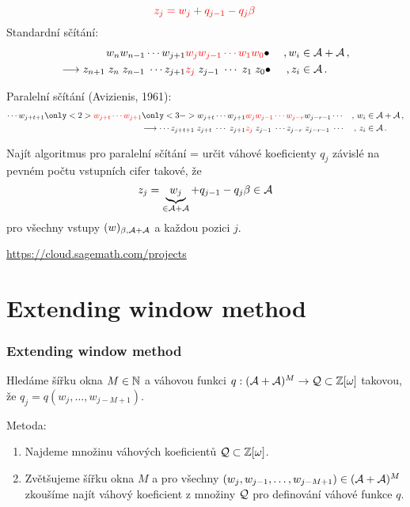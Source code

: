 \documentclass[11pt]{beamer}
\begin{document}
\begin{frame}
    $$
        \textcolor{red}{z_j=w_j + q_{j-1} - q_j \beta}\,
    $$
  Standardní sčítání:%
  \begin{align*}
    w_n w_{n-1}\cdots w_{j+1}& \textcolor{red}{w_j w_{j-1} \cdots w_1 w_0}\bullet& \,,w_i &\in \mathcal{A}+\mathcal{A}\,,    \\
    \longrightarrow z_{n+1}\; z_{n}\; z_{n-1}\;\cdots z_{j+1} &\textcolor{red}{z_j} \; z_{j-1}\; \cdots \;z_1 \; z_0\bullet& \,,z_i &\in \mathcal{A}\,.
  \end{align*}
    
  \pause 
   Paralelní sčítání (Avizienis, 1961):
  \begin{align*}
    \cdots w_{j+t+1}\only<2>{\textcolor{red}{w_{j+t} \cdots w_{j+1}}} \only<3->{w_{j+t} \cdots w_{j+1}}& \textcolor{red}{w_j w_{j-1} \cdots w_{j-r}}w_{j-r-1} \cdots &,\, w_i &\in \A + \A\,,    \\
    \longrightarrow \cdots z_{j+t+1}\;z_{j+t} \; \cdots \; z_{j+1} &\textcolor{red}{z_j} \; z_{j-1}\; \cdots z_{j-r}\;z_{j-r-1}\; \cdots &,\, z_i &\in \A\,.
  \end{align*}

    
\end{frame}

\begin{frame}
Najít algoritmus pro paralelní sčítání = určit váhové koeficienty $q_j$ závislé na pevném počtu vstupních cifer takové, že 
    $$
        z_j=\underbrace{w_j}_{\in \mathcal{A} +\mathcal{A}} + q_{j-1} - q_j \beta \in \mathcal{A} 
    $$
    pro všechny vstupy $(w)_{\beta,\mathcal{A}+\mathcal{A}}$ a každou pozici $j$.
    
    \rule{0cm}{0cm}
    
     \url{https://cloud.sagemath.com/projects}
\end{frame}


\section{Extending window method}
\begin{frame}
    \frametitle{Extending window method}
    
    Hledáme šířku okna $M \in \mathbb{N}$ a váhovou funkci $q:(\mathcal{A}+\mathcal{A})^{M} \rightarrow \mathcal{Q} \subset \mathbb{Z}[\omega]$ takovou, že $q_j=q(w_j, \dots, w_{j-M+1})$.
        
    \pause
    \vspace{20pt}
    Metoda:
    \begin{enumerate}
        \item Najdeme množinu váhových koeficientů $\mathcal{Q} \subset \mathbb{Z}[\omega]$.
        \item Zvětšujeme šířku okna $M$ a pro všechny $(w_j,w_{j-1}, \dots , w_{j-M+1}) \in (\mathcal{A}+\mathcal{A})^{M}$ zkoušíme najít váhový koeficient z množiny $\mathcal{Q}$ pro definování váhové funkce $q$.
    \end{enumerate}
\end{frame}
\end{document}
